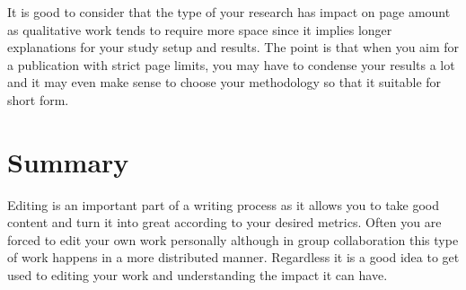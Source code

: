 It is good to consider that the type of your research has impact on page amount as qualitative work tends to require more space since it implies longer explanations for your study setup and results.
The point is that when you aim for a publication with strict page limits, you may have to condense your results a lot and it may even make sense to choose your methodology so that it suitable for short form.

\section{Summary}

Editing is an important part of a writing process as it allows you to take good content and turn it into great according to your desired metrics.
Often you are forced to edit your own work personally although in group collaboration this type of work happens in a more distributed manner.
Regardless it is a good idea to get used to editing your work and understanding the impact it can have.
